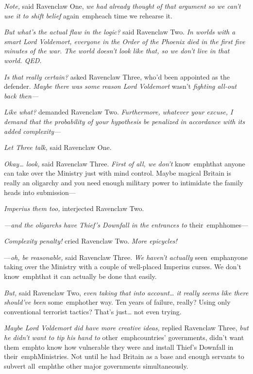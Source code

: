 \emph{Note,} said Ravenclaw One, \emph{we had already thought of that argument 
so we can't use it to shift belief} again\ emph{each time we rehearse it.}

\emph{But what's the actual flaw in the logic?} said Ravenclaw Two. \emph{In 
worlds with a smart Lord Voldemort, everyone in the Order of the Phoenix died 
in the first five minutes of the war. The world doesn't look like that, so we 
don't live in that world. QED.}

\emph{Is that really certain?} asked Ravenclaw Three, who'd been appointed as 
the defender. \emph{Maybe there was some reason Lord Voldemort} wasn't 
\emph{fighting all-out back then---}

\emph{Like what?} demanded Ravenclaw Two. \emph{Furthermore, whatever your 
excuse, I demand that the probability of your hypothesis be penalized in 
accordance with its added complexity---}

\emph{Let Three talk,} said Ravenclaw One.

\emph{Okay{\ldots} look,} said Ravenclaw Three. \emph{First of all, we don't} 
know\ emph{that anyone can take over the Ministry just with mind control. Maybe 
magical Britain is really an oligarchy and you need enough military power to 
intimidate the family heads into submission---}

\emph{Imperius them too,} interjected Ravenclaw Two.

\emph{---and the oligarchs have Thief's Downfall in the entrances to} 
their\ emph{homes---}

\emph{Complexity penalty!} cried Ravenclaw Two. \emph{More epicycles!}

---\emph{oh, be reasonable,} said Ravenclaw Three. \emph{We haven't actually} 
seen\ emph{anyone taking over the Ministry with a couple of well-placed 
Imperius curses. We don't} know\ emph{that it can actually be done that easily.}

\emph{But,} said Ravenclaw Two, \emph{even taking that into account{\ldots} it 
really seems like there should've been} some\ emph{other way. Ten years of 
failure, really? Using only conventional terrorist tactics? That's just{\ldots} 
not even} trying.

\emph{Maybe Lord Voldemort did have more creative ideas,} replied Ravenclaw 
Three, \emph{but he didn't want to tip his hand to} other\ emph{countries' 
governments, didn't want} them\ emph{to know how vulnerable they were and 
install Thief's Downfall in} their\ emph{Ministries. Not until he had Britain 
as a base and enough servants to subvert} all\ emph{the other major governments 
simultaneously.}

